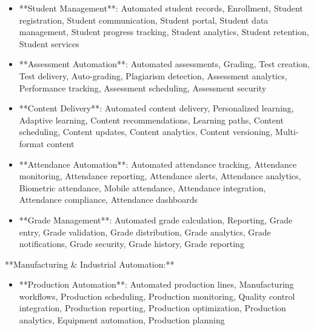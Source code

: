 \documentclass[11pt,a4paper]{article}
\begin{document}
\begin{itemize}
\item **Student Management**: Automated student records, Enrollment, Student registration, Student communication, Student portal, Student data management, Student progress tracking, Student analytics, Student retention, Student services
\end{itemize}

\begin{itemize}
\item **Assessment Automation**: Automated assessments, Grading, Test creation, Test delivery, Auto-grading, Plagiarism detection, Assessment analytics, Performance tracking, Assessment scheduling, Assessment security
\end{itemize}

\begin{itemize}
\item **Content Delivery**: Automated content delivery, Personalized learning, Adaptive learning, Content recommendations, Learning paths, Content scheduling, Content updates, Content analytics, Content versioning, Multi-format content
\end{itemize}

\begin{itemize}
\item **Attendance Automation**: Automated attendance tracking, Attendance monitoring, Attendance reporting, Attendance alerts, Attendance analytics, Biometric attendance, Mobile attendance, Attendance integration, Attendance compliance, Attendance dashboards
\end{itemize}

\begin{itemize}
\item **Grade Management**: Automated grade calculation, Reporting, Grade entry, Grade validation, Grade distribution, Grade analytics, Grade notifications, Grade security, Grade history, Grade reporting
\end{itemize}

**Manufacturing \& Industrial Automation:**

\begin{itemize}
\item **Production Automation**: Automated production lines, Manufacturing workflows, Production scheduling, Production monitoring, Quality control integration, Production reporting, Production optimization, Production analytics, Equipment automation, Production planning
\end{itemize}
\end{document}
